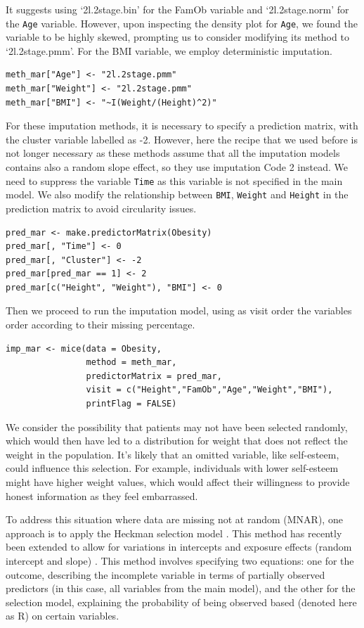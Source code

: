 \documentclass[
  article]{jss}
\begin{document}
It suggests using `2l.2stage.bin' for the FamOb variable and
`2l.2stage.norm' for the \texttt{Age} variable. However, upon inspecting
the density plot for \texttt{Age}, we found the variable to be highly
skewed, prompting us to consider modifying its method to
`2l.2stage.pmm'. For the BMI variable, we employ deterministic
imputation.

\begin{verbatim}
meth_mar["Age"] <- "2l.2stage.pmm"
meth_mar["Weight"] <- "2l.2stage.pmm"
meth_mar["BMI"] <- "~I(Weight/(Height)^2)"
\end{verbatim}

For these imputation methods, it is necessary to specify a prediction
matrix, with the cluster variable labelled as -2. However, here the
recipe that we used before is not longer necessary as these methods
assume that all the imputation models contains also a random slope
effect, so they use imputation Code 2 instead. We need to suppress the
variable \texttt{Time} as this variable is not specified in the main
model. We also modify the relationship between \texttt{BMI},
\texttt{Weight} and \texttt{Height} in the prediction matrix to avoid
circularity issues.

\begin{verbatim}
pred_mar <- make.predictorMatrix(Obesity)
pred_mar[, "Time"] <- 0
pred_mar[, "Cluster"] <- -2 
pred_mar[pred_mar == 1] <- 2
pred_mar[c("Height", "Weight"), "BMI"] <- 0
\end{verbatim}

Then we proceed to run the imputation model, using as visit order the
variables order according to their missing percentage.

\begin{verbatim}
imp_mar <- mice(data = Obesity,
                method = meth_mar,
                predictorMatrix = pred_mar,
                visit = c("Height","FamOb","Age","Weight","BMI"),
                printFlag = FALSE)
\end{verbatim}

We consider the possibility that patients may not have been selected
randomly, which would then have led to a distribution for weight that
does not reflect the weight in the population. It's likely that an
omitted variable, like self-esteem, could influence this selection. For
example, individuals with lower self-esteem might have higher weight
values, which would affect their willingness to provide honest
information as they feel embarrassed.

To address this situation where data are missing not at random (MNAR),
one approach is to apply the Heckman selection model \citep{munoz2023b}.
This method has recently been extended to allow for variations in
intercepts and exposure effects (random intercept and slope)
\citep{galimard2018, munoz2023}. This method involves specifying two
equations: one for the outcome, describing the incomplete variable in
terms of partially observed predictors (in this case, all variables from
the main model), and the other for the selection model, explaining the
probability of being observed based (denoted here as R) on certain
variables.
\end{document}
